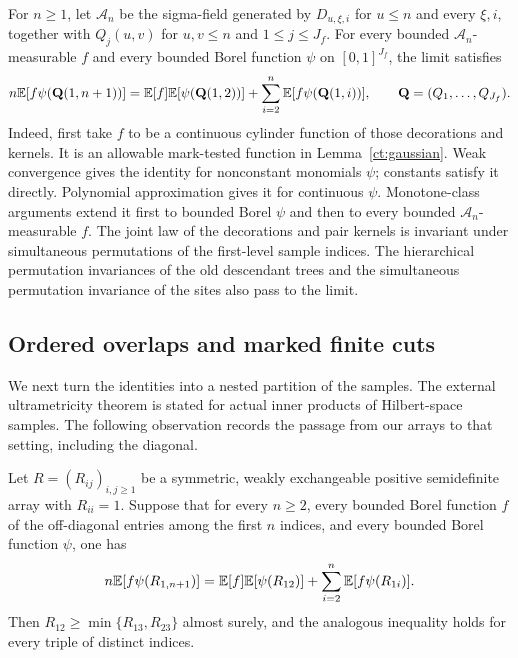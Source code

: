 For $n\ge1$, let $\mathcal A_n$ be the sigma-field generated by
$D_{u,\xi,i}$ for $u\le n$ and every $\xi,i$, together with
$Q_j(u,v)$ for $u,v\le n$ and $1\le j\le J_f$. For every bounded $\mathcal A_n$-measurable $f$ and every
bounded Borel function $\psi$ on $[0,1]^{J_f}$, the limit satisfies
\begin{equation}\label{ct:marked-gg}
 n\mathbb E[f\psi(\mathbf Q(1,n+1))]
 =\mathbb E[f]\mathbb E[\psi(\mathbf Q(1,2))]
       +\sum_{i=2}^n\mathbb E[f\psi(\mathbf Q(1,i))],
 \qquad \mathbf Q=(Q_1,\ldots,Q_{J_f}).
\end{equation}
Indeed, first take $f$ to be a continuous cylinder function of those
decorations and kernels. It is an allowable mark-tested function in
Lemma~\ref{ct:gaussian}. Weak convergence gives the identity for
nonconstant monomials $\psi$; constants satisfy it directly. Polynomial
approximation gives it for continuous $\psi$. Monotone-class arguments
extend it first to bounded Borel $\psi$ and then to every bounded
$\mathcal A_n$-measurable $f$.
The joint law of the decorations and pair kernels is invariant under
simultaneous permutations of the first-level sample indices. The
hierarchical permutation invariances of the old descendant trees and
the simultaneous permutation invariance of the sites also pass to the
limit.

\subsection{Ordered overlaps and marked finite cuts}\label{ct:sub-cuts}

We next turn the identities into a nested partition of the samples.
The external ultrametricity theorem is stated for actual inner products
of Hilbert-space samples.  The following observation records the passage
from our arrays to that setting, including the diagonal.

\begin{samepage}
\begin{lemma}\label{ct:gram-bridge}
Let $R=(R_{ij})_{i,j\ge1}$ be a symmetric, weakly exchangeable positive
semidefinite array with $R_{ii}=1$.  Suppose that for every $n\ge2$,
every bounded Borel function $f$ of the off-diagonal entries among the
first $n$ indices, and every bounded Borel function $\psi$, one has
\[
 n\mathbb E[f\psi(R_{1,n+1})]
 =\mathbb E[f]\mathbb E[\psi(R_{12})]+\sum_{i=2}^n\mathbb E[f\psi(R_{1i})].
\]
Then $R_{12}\ge\min\{R_{13},R_{23}\}$ almost surely, and the analogous
inequality holds for every triple of distinct indices.
\end{lemma}
\end{samepage}

